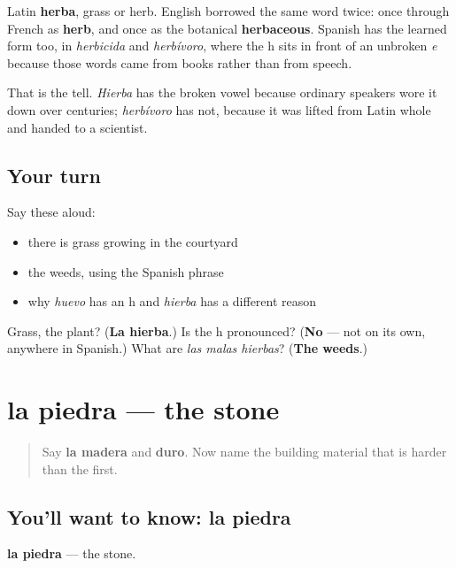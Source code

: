 \begin{cousinweb}
Latin \textbf{herba}, grass or herb. English borrowed the same word twice: once through French as \textbf{herb}, and once as the botanical \textbf{herbaceous}. Spanish has the learned form too, in \emph{herbicida} and \emph{herbívoro}, where the h sits in front of an unbroken \emph{e} because those words came from books rather than from speech.

That is the tell. \emph{Hierba} has the broken vowel because ordinary speakers wore it down over centuries; \emph{herbívoro} has not, because it was lifted from Latin whole and handed to a scientist.
\end{cousinweb}

\subsection*{Your turn}
Say these aloud:

\begin{itemize}
\raggedright
  \item there is grass growing in the courtyard
  \item the weeds, using the Spanish phrase
  \item why \emph{huevo} has an h and \emph{hierba} has a different reason
\end{itemize}

\begin{tcolorbox}[breakable,colback=teal!4,colframe=teal!35!black,title={Before you move on}]
Grass, the plant? (\textbf{La hierba}.) Is the h pronounced? (\textbf{No} — not on its own, anywhere in Spanish.) What are \emph{las malas hierbas}? (\textbf{The weeds}.)
\end{tcolorbox}
\section[la piedra]{la piedra — the stone}

\label{lesson:ES-C450-piedra}



\begin{quote}
Say \textbf{la madera} and \textbf{duro}. Now name the building material that is harder than the first.
\end{quote}

\subsection*{You'll want to know: la piedra}
\textbf{la piedra} — the stone.

